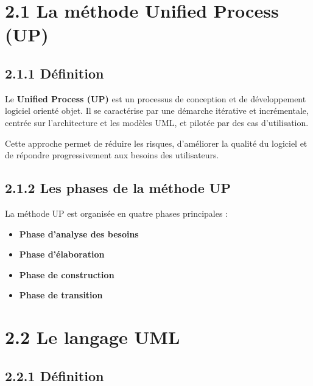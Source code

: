 \documentclass[12pt,a4paper]{report}
\begin{document}
\vspace*{\fill}
\newpage
\setcounter{page}{1}

\section*{2.1 La m\'ethode Unified Process (UP)}

\subsection*{2.1.1 D\'efinition}

Le \textbf{Unified Process (UP)} est un processus de conception et de d\'eveloppement logiciel orient\'e objet. Il se caract\'erise par une d\'emarche it\'erative et incr\'ementale, centr\'ee sur l'architecture et les mod\`eles UML, et pilot\'ee par des cas d'utilisation.

Cette approche permet de r\'eduire les risques, d'am\'eliorer la qualit\'e du logiciel et de r\'epondre progressivement aux besoins des utilisateurs.

\subsection*{2.1.2 Les phases de la m\'ethode UP}

La m\'ethode UP est organis\'ee en quatre phases principales :

\begin{itemize}
    \item \textbf{Phase d'analyse des besoins}
    \item \textbf{Phase d'\'elaboration}
    \item \textbf{Phase de construction}
    \item \textbf{Phase de transition}
\end{itemize}

\section*{2.2 Le langage UML}

\subsection*{2.2.1 D\'efinition}
\end{document}
